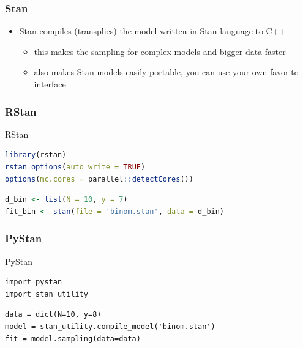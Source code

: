 \documentclass[10pt]{beamer}
\begin{document}



\begin{frame}

\frametitle{Stan}

  \begin{itemize}
  \item Stan compiles (transplies) the model written in Stan language to C++
    \begin{itemize}
    \item this makes the sampling for complex models and bigger data faster
    \item also makes Stan models easily portable, you can use your own
      favorite interface
    \end{itemize}
  \end{itemize}

\end{frame}

\begin{frame}[fragile]

\frametitle{RStan}

  {\small\color{gray}
    {
      RStan
\begin{lstlisting}[language=R]
library(rstan)
rstan_options(auto_write = TRUE)
options(mc.cores = parallel::detectCores())
\end{lstlisting}
    }
{
\begin{lstlisting}[language=R]
d_bin <- list(N = 10, y = 7)
fit_bin <- stan(file = 'binom.stan', data = d_bin)
\end{lstlisting}
}
}
\end{frame}

\begin{frame}[fragile]

\frametitle{PyStan}

  {\small\color{gray}
{
      PyStan
\begin{lstlisting}
import pystan
import stan_utility
\end{lstlisting}
    }
    {
\begin{lstlisting}
data = dict(N=10, y=8)
model = stan_utility.compile_model('binom.stan')
fit = model.sampling(data=data)
\end{lstlisting}
    }
  }
\end{frame}
\end{document}
